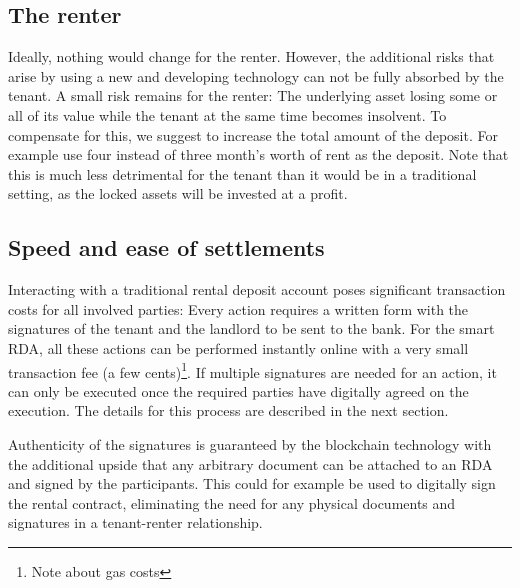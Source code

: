 \documentclass[12pt,a4paper,titlepage,oneside,english]{article}
\begin{document}
\subsection{The renter}
Ideally, nothing would change for the renter. However, the additional risks that arise by using a new and developing technology can not be fully absorbed by the tenant. A small risk remains for the renter: The underlying asset losing some or all of its value while the tenant at the same time becomes insolvent. 
To compensate for this, we suggest to increase the total amount of the deposit. For example use four instead of three month's worth of rent as the deposit. Note that this is much less detrimental for the tenant than it would be in a traditional setting, as the locked assets will be invested at a profit.

\subsection{Speed and ease of settlements}
Interacting with a traditional rental deposit account poses significant transaction costs for all involved parties: Every action requires a written form with the signatures of the tenant and the landlord to be sent to the bank. For the smart RDA, all these actions can be performed instantly online with a very small transaction fee (a few cents)\footnote{Note about gas costs}. If multiple signatures are needed for an action, it can only be executed once the required parties have digitally agreed on the execution. The details for this process are described in the next section. 

Authenticity of the signatures is guaranteed by the blockchain technology with the additional upside that any arbitrary document can be attached to an RDA and signed by the participants. This could for example be used to digitally sign the rental contract, eliminating the need for any physical documents and signatures in a tenant-renter relationship.



\end{document}
